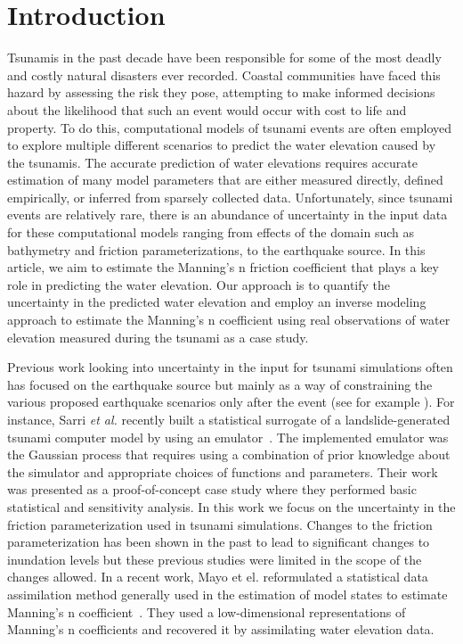 
\section{Introduction}

Tsunamis in the past decade have been responsible for some of the most 
deadly and costly natural disasters ever recorded. Coastal communities 
have faced this hazard by assessing the risk they pose, attempting 
to make informed decisions about the likelihood that such an event would 
occur with cost to life and property.  To do this, computational models of 
tsunami events are often employed to explore multiple different scenarios
to predict the water elevation caused by the tsunamis. The accurate prediction 
of water elevations requires accurate estimation of many model parameters that 
are either measured directly, defined empirically, or inferred from
sparsely collected data. Unfortunately, since tsunami events are relatively rare, 
there is an abundance of uncertainty in the input data for these computational 
models ranging from effects of the domain such as bathymetry and friction parameterizations, 
to the earthquake source.  In this article, we aim to estimate the Manning's n friction
coefficient that plays a key role in predicting the water elevation. 
Our approach is to quantify the uncertainty in the predicted water elevation 
and employ an inverse modeling approach to estimate the Manning's n coefficient 
using real observations of water elevation measured during the \tohoku tsunami as a case study.

Previous work looking into uncertainty in the input for tsunami simulations often has focused on the earthquake source but mainly as a way of constraining the various proposed earthquake scenarios only after the event (see for example \cite{MacInnes:2013cr}).  For instance, Sarri \emph{et al.} recently built a statistical surrogate of a landslide-generated tsunami computer model by using an emulator~\cite{Sarri2012}. The implemented emulator was the Gaussian process that requires using a combination of prior knowledge about the simulator and
appropriate choices of functions and parameters. Their work was presented as a proof-of-concept case study
where they performed basic statistical and sensitivity analysis. In this work we focus on the uncertainty in the friction parameterization used in tsunami simulations.  Changes to the friction parameterization has been shown in the past to lead to significant changes to inundation levels \cite{Myers:2001el,Jakeman:2010hk} but these previous studies were limited in the scope of the changes allowed.  In a recent work, Mayo et el. reformulated a statistical data assimilation method generally used in the estimation of model states to estimate Manning's n coefficient~\cite{Mayo2013}. They used a low-dimensional representations of Manning's n coefficients and recovered it by assimilating water elevation data.

